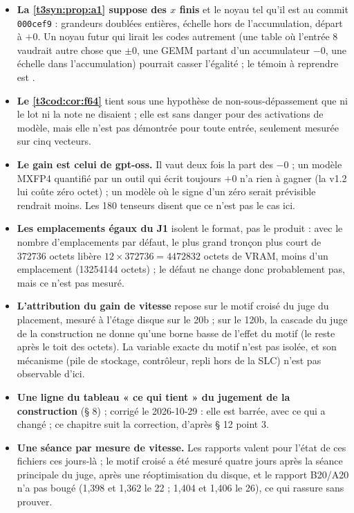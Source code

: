 \begin{faux}
\begin{itemize}
\item \textbf{La \cref{t3syn:prop:a1} suppose des $x$ finis} et le noyau tel qu'il est au commit \texttt{000cef9} : grandeurs doublées entières, échelle hors de l'accumulation, départ à $+0$. Un noyau futur qui lirait les codes autrement (une table où l'entrée 8 vaudrait autre chose que $\pm 0$, une GEMM partant d'un accumulateur $-0$, une échelle dans l'accumulation) pourrait casser l'égalité ; le témoin à reprendre est .
\item \textbf{Le \cref{t3cod:cor:f64}} tient sous une hypothèse de non-sous-dépassement que ni le lot ni la note ne disaient ; elle est sans danger pour des activations de modèle, mais elle n'est pas démontrée pour toute entrée, seulement mesurée sur cinq vecteurs.
\item \textbf{Le gain est celui de gpt-oss.} Il vaut deux fois la part des $-0$ ; un modèle MXFP4 quantifié par un outil qui écrit toujours $+0$ n'a rien à gagner (la v1.2 lui coûte zéro octet) ; un modèle où le signe d'un zéro serait prévisible rendrait moins. Les 180 tenseurs disent que ce n'est pas le cas ici.
\item \textbf{Les emplacements égaux du J1} isolent le format, pas le produit : avec le nombre d'emplacements par défaut, le plus grand tronçon plus court de \num{372736} octets libère $12 \times \num{372736} = \num{4472832}$ octets de VRAM, moins d'un emplacement (\num{13254144} octets) ; le défaut ne change donc probablement pas, mais ce n'est pas mesuré.
\item \textbf{L'attribution du gain de vitesse} repose sur le motif croisé du juge du placement, mesuré à l'étage disque sur le 20b ; sur le 120b, la cascade du juge de la construction ne donne qu'une borne basse de l'effet du motif (le reste après le toit des octets). La variable exacte du motif n'est pas isolée, et son mécanisme (pile de stockage, contrôleur, repli hors de la SLC) n'est pas observable d'ici.
\item \textbf{Une ligne du tableau « ce qui tient » du jugement de la construction} (§ 8)  ; corrigé le 2026-10-29 : elle est barrée, avec ce qui a changé ; ce chapitre suit la correction, d'après  § 12 point 3.
\item \textbf{Une séance par mesure de vitesse.} Les rapports valent pour l'état de ces fichiers ces jours-là ; le motif croisé a été mesuré quatre jours après la séance principale du juge, après une réoptimisation du disque, et le rapport B20/A20 n'a pas bougé (1,398 et 1,362 le 22 ; 1,404 et 1,406 le 26), ce qui rassure sans prouver.

\end{itemize}
\end{faux}
